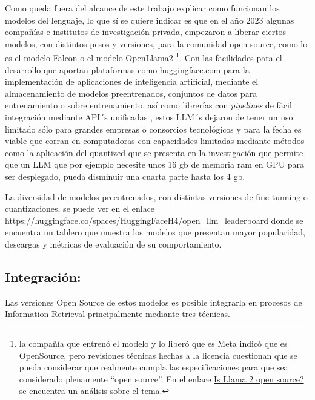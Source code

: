 \documentclass[
  10,
  openany]{book}
\begin{document}
Como queda fuera del alcance de este trabajo explicar como funcionan los modelos del lenguaje, lo que sí se quiere indicar es que en el año 2023 algunas compañías e institutos de investigación privada, empezaron a liberar ciertos modelos, con distintos pesos y versiones, para la comunidad open source, como lo es el modelo Falcon \citep{penedo2023} o el modelo OpenLlama2 \citep{touvron2023} \footnote{la compañía que entrenó el modelo y lo liberó que es Meta indicó que es OpenSource, pero revisiones técnicas hechas a la licencia cuestionan que se pueda considerar que realmente cumpla las especificaciones para que sea considerado plenamente ``open source''. En el enlace \href{https://opensourceconnections.com/blog/2023/07/19/is-llama-2-open-source-no-and-perhaps-we-need-a-new-definition-of-open/}{Is Llama 2 open source?} se encuentra un análisis sobre el tema.}. Con las facilidades para el desarrollo que aportan plataformas como \url{huggingface.com} para la implementación de aplicaciones de inteligencia artificial, mediante el almacenamiento de modelos preentrenados, conjuntos de datos para entrenamiento o sobre entrenamiento, así como librerías con \emph{pipelines} de fácil integración mediante API´s unificadas \citep{wolf2019}, estos LLM´s dejaron de tener un uso limitado sólo para grandes empresas o consorcios tecnológicos y para la fecha es viable que corran en computadoras con capacidades limitadas mediante métodos como la aplicación del quantized que se presenta en la investigación \citep{dettmers2023} que permite que un LLM que por ejemplo necesite unos 16 gb de memoria ram en GPU para ser desplegado, pueda disminuir una cuarta parte hasta los 4 gb.

La diversidad de modelos preentrenados, con distintas versiones de fine tunning o cuantizaciones, se puede ver en el enlace \url{https://huggingface.co/spaces/HuggingFaceH4/open_llm_leaderboard} \citep{open-llm-leaderboard} donde se encuentra un tablero que muestra los modelos que presentan mayor popularidad, descargas y métricas de evaluación de su comportamiento.

\hypertarget{int}{%
\subsection{Integración:}\label{int}}

Las versiones Open Source de estos modelos es posible integrarla en procesos de Information Retrieval principalmente mediante tres técnicas.
\end{document}
